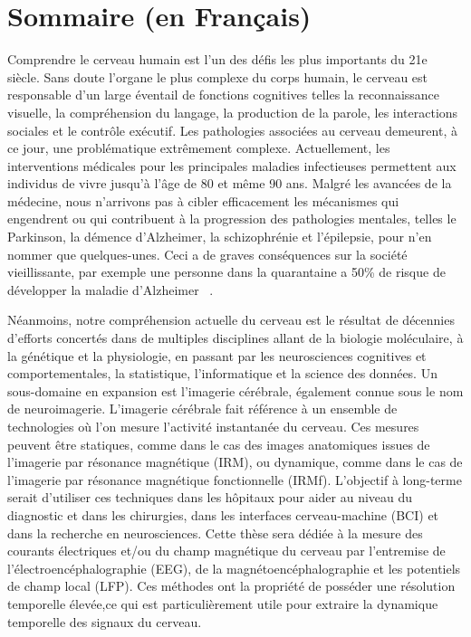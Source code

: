 \chapter{Sommaire (en Français)}
\label{chapter:sommaire}
\pagestyle{mainmatter}

Comprendre le cerveau humain  est l'un des défis les plus importants du 21e siècle. Sans doute l'organe le plus complexe du corps humain, le cerveau est responsable  d’un large éventail de fonctions cognitives telles la reconnaissance visuelle, la compréhension du langage, la production de la parole, les interactions sociales et le contrôle exécutif. Les pathologies associées au cerveau demeurent, à ce jour, une problématique extrêmement complexe.  Actuellement, les interventions médicales pour les principales maladies infectieuses permettent aux individus de vivre jusqu'à l’âge de 80 et même  90 ans. Malgré les avancées de la médecine, nous n’arrivons pas à cibler efficacement les mécanismes  qui engendrent ou qui contribuent à la progression des pathologies mentales, telles le Parkinson, la démence d’Alzheimer, la schizophrénie  et l’épilepsie, pour n'en nommer que quelques-unes. Ceci a de graves conséquences sur la société vieillissante, par exemple une personne  dans la quarantaine a 50\% de risque de développer la maladie d'Alzheimer ~\citep{alzheimer20162016}.

Néanmoins, notre compréhension actuelle du cerveau est le résultat de décennies d'efforts concertés dans de multiples disciplines allant de la biologie moléculaire, à la génétique et la physiologie, en passant par les neurosciences cognitives et comportementales, la statistique, l'informatique et la science des données. Un sous-domaine en expansion est l'imagerie cérébrale, également connue sous le nom de neuroimagerie. L'imagerie cérébrale fait référence à un ensemble de technologies où l'on mesure l’activité  instantanée du cerveau. Ces mesures peuvent être statiques, comme dans le cas des images anatomiques issues de l'imagerie par résonance magnétique (IRM), ou dynamique, comme dans le cas de l'imagerie par résonance magnétique fonctionnelle (IRMf). L’objectif à long-terme serait d’utiliser ces techniques  dans les hôpitaux pour aider au niveau du diagnostic et dans les chirurgies, dans les interfaces cerveau-machine (BCI) et dans la recherche en neurosciences. Cette thèse sera dédiée à  la mesure des courants électriques et/ou du champ magnétique du cerveau par l’entremise de l'électroencéphalographie (EEG), de la magnétoencéphalographie et les potentiels de champ local (LFP). Ces méthodes ont la propriété de posséder une résolution temporelle élevée,ce qui est particulièrement utile pour extraire la dynamique temporelle des signaux du cerveau.

